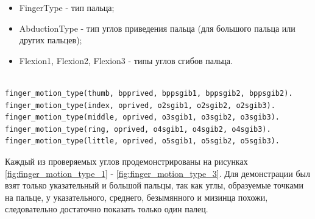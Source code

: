 \begin{itemize}
	\item FingerType - тип пальца;
	\item AbductionType - тип углов приведения пальца (для большого пальца или других пальцев);
	\item Flexion1, Flexion2, Flexion3 - типы углов сгибов пальца.
\end{itemize}

\begin{lstlisting}[caption=Знания о типах проверок каждого пальца, label=facts:fingermotiontype]
%finger_motion_type(FingerType, AbductionType, Flexion1, Flexion2, Flexion3).

finger_motion_type(thumb, bpprived, bppsgib1, bppsgib2, bppsgib2).
finger_motion_type(index, oprived, o2sgib1, o2sgib2, o2sgib3).
finger_motion_type(middle, oprived, o3sgib1, o3sgib2, o3sgib3).
finger_motion_type(ring, oprived, o4sgib1, o4sgib2, o4sgib3).
finger_motion_type(little, oprived, o5sgib1, o5sgib2, o5sgib3).
\end{lstlisting}

\hspace{0.6cm} Каждый из проверяемых углов продемонстрированы на рисунках \ref{fig:finger_motion_type_1} - \ref{fig:finger_motion_type_3}. Для демонстрации был взят только указательный и большой пальцы, так как углы, образуемые точками на пальце, у указательного, среднего, безымянного и мизинца похожи, следовательно достаточно показать только один палец.

